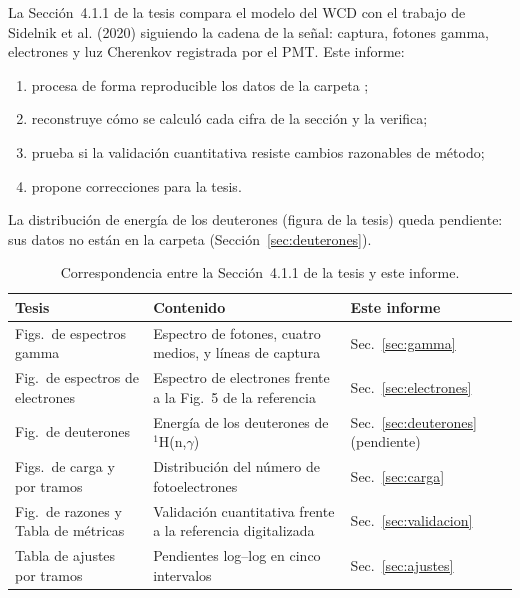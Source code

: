 \documentclass[11pt,a4paper]{article}
\begin{document}
La Sección~4.1.1 de la tesis compara el modelo del WCD con el trabajo de Sidelnik et al. (2020) siguiendo la cadena de la señal: captura, fotones gamma, electrones y luz Cherenkov registrada por el PMT. Este informe:
\begin{enumerate}
  \item procesa de forma reproducible los datos de la carpeta ;
  \item reconstruye cómo se calculó cada cifra de la sección y la verifica;
  \item prueba si la validación cuantitativa resiste cambios razonables de método;
  \item propone correcciones para la tesis.
\end{enumerate}
La distribución de energía de los deuterones (figura  de la tesis) queda pendiente: sus datos no están en la carpeta (Sección~\ref{sec:deuterones}).

\begin{table}[H]
\centering\small
\caption{Correspondencia entre la Sección~4.1.1 de la tesis y este informe.}
\label{tab:correspondencia}
\begin{tabularx}{\linewidth}{@{}>{\raggedright\arraybackslash}p{4.2cm}>{\raggedright\arraybackslash}X>{\raggedright\arraybackslash}p{3.6cm}@{}}
\toprule
\textbf{Tesis} & \textbf{Contenido} & \textbf{Este informe} \\
\midrule
Figs.\ de espectros gamma & Espectro de fotones, cuatro medios, y líneas de captura & Sec.~\ref{sec:gamma} \\
Fig.\ de espectros de electrones & Espectro de electrones frente a la Fig.~5 de la referencia & Sec.~\ref{sec:electrones} \\
Fig.\ de deuterones & Energía de los deuterones de $^1$H(n,$\gamma$) & Sec.~\ref{sec:deuterones} (pendiente) \\
Figs.\ de carga y por tramos & Distribución del número de fotoelectrones & Sec.~\ref{sec:carga} \\
Fig.\ de razones y Tabla de métricas & Validación cuantitativa frente a la referencia digitalizada & Sec.~\ref{sec:validacion} \\
Tabla de ajustes por tramos & Pendientes log--log en cinco intervalos & Sec.~\ref{sec:ajustes} \\
\bottomrule
\end{tabularx}
\end{table}
\end{document}
